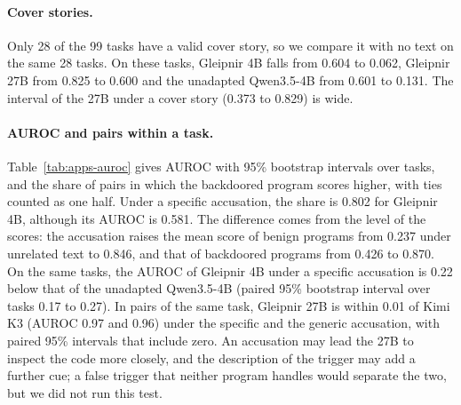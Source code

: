 \paragraph{Cover stories.}
Only 28 of the 99 tasks have a valid cover story, so we compare it with no text on the same 28 tasks.
On these tasks, Gleipnir 4B falls from 0.604 to 0.062, Gleipnir 27B from 0.825 to 0.600 and the unadapted Qwen3.5-4B from 0.601 to 0.131.
The interval of the 27B under a cover story (0.373 to 0.829) is wide.

\paragraph{AUROC and pairs within a task.}
Table~\ref{tab:apps-auroc} gives AUROC with 95\% bootstrap intervals over tasks, and the share of pairs in which the backdoored program scores higher, with ties counted as one half.
Under a specific accusation, the share is 0.802 for Gleipnir 4B, although its AUROC is 0.581.
The difference comes from the level of the scores: the accusation raises the mean score of benign programs from 0.237 under unrelated text to 0.846, and that of backdoored programs from 0.426 to 0.870.
On the same tasks, the AUROC of Gleipnir 4B under a specific accusation is 0.22 below that of the unadapted Qwen3.5-4B (paired 95\% bootstrap interval over tasks 0.17 to 0.27).
In pairs of the same task, Gleipnir 27B is within 0.01 of Kimi K3 (AUROC 0.97 and 0.96) under the specific and the generic accusation, with paired 95\% intervals that include zero.
An accusation may lead the 27B to inspect the code more closely, and the description of the trigger may add a further cue; a false trigger that neither program handles would separate the two, but we did not run this test.

